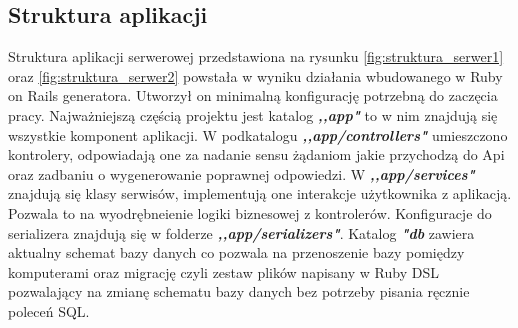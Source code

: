 \documentclass[declaration,shortabstract]{iithesis}
\begin{document}
\subsection{Struktura aplikacji}
Struktura aplikacji serwerowej przedstawiona na rysunku \ref{fig:struktura_serwer1} oraz \ref{fig:struktura_serwer2} powstała w wyniku działania wbudowanego w Ruby on Rails generatora. Utworzył on minimalną konfigurację potrzebną do zaczęcia pracy. Najważniejszą częścią projektu jest katalog \textbf{\textit{,,app"}} to w nim znajdują się wszystkie komponent aplikacji. W podkatalogu \textbf{\textit{,,app/controllers"}} umieszczono kontrolery, odpowiadają one za nadanie sensu żądaniom jakie przychodzą do Api oraz zadbaniu o wygenerowanie poprawnej odpowiedzi. W \textbf{\textit{,,app/services"}} znajdują się klasy serwisów, implementują one interakcje użytkownika z aplikacją. Pozwala to na wyodrębneienie logiki biznesowej z kontrolerów. Konfiguracje do serializera znajdują się w folderze \textbf{\textit{,,app/serializers"}}. Katalog \textbf{\textit{"db}} zawiera aktualny schemat bazy danych co pozwala na przenoszenie bazy pomiędzy komputerami oraz migrację czyli zestaw plików napisany w Ruby DSL pozwalający na zmianę schematu bazy danych bez potrzeby pisania ręcznie poleceń SQL.
\end{document}
